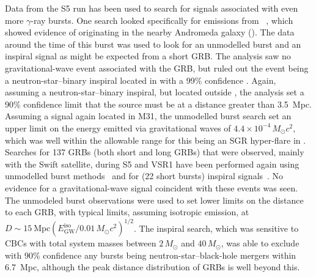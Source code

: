 Data from the S5 run has been used to search for signals associated with even
more $\gamma$-ray bursts. One search looked specifically for emissions from
~\cite{Golenetskii:2007a, Golenetskii:2007b}, which showed 
evidence of originating in the nearby Andromeda galaxy (). The data
around the time of this burst was used to look for an unmodelled burst and an
inspiral signal as might be expected from a short GRB. The analysis saw no
gravitational-wave event associated with the GRB, but ruled out the event being
a neutron-star--binary inspiral located in  with a 99\% confidence
\cite{Abbott:2008g}. Again, assuming a neutron-star--binary inspiral, but located
outside , the analysis set a 90\% confidence limit that the source must be at
a distance greater than 3.5~Mpc. Assuming a signal again located in M31, the
unmodelled burst search set an upper limit on the energy emitted via
gravitational waves of $4.4\times10^{-4}\,M_{\odot}c^2$, which was
well within the allowable range for this being an SGR hyper-flare in .
Searches for 137 GRBs (both short and long GRBs) that were observed, mainly with
the Swift satellite, during S5 and VSR1 have been performed again using
unmodelled burst methods~\cite{Abbott:2009d} and for (22 short bursts) inspiral
signals~\cite{Abadie:2010b}. No evidence for a gravitational-wave signal
coincident with these events was seen. The unmodeled burst observations were
used to set lower limits on the distance to each GRB, with typical limits,
assuming isotropic emission, at
$D\sim15\mathrm{\ Mpc}(E^{\mathrm{iso}}_{\mathrm{GW}}/0.01\,M_{\odot}c^2)^{1/2}$. The
inspiral search, which was sensitive to CBCs with total system masses
between $2\,M_{\odot}$ and $40\,M_{\odot}$, was able to exclude with
90\% confidence any bursts being neutron-star--black-hole mergers
within 6.7~Mpc, although the peak distance distribution of GRBs is
well beyond this.


